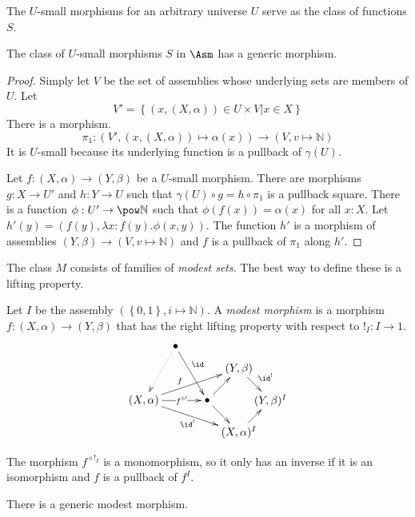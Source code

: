 \documentclass{tac}
\newcommand\set[1]{\left\{#1\right\}}
\newcommand\N{\mathbb N}
\newcommand\bang{!}
\newcommand\of{:}
\newcommand\gen\gamma
\newcommand\pe[1]{^{\diamond #1}}
\begin{document}
The $U$-small morphisms for an arbitrary universe $U$ serve as the class of functions $S$.

\begin{lemma} The class of $U$-small morphisms $S$ in $\Asm$ has a generic morphism. \end{lemma}

\begin{proof}
Simply let $V$ be the set of assemblies whose underlying sets are members of $U$.
Let 
\[ V'=\set{(x,(X,\alpha)) \in U\times V| x\in X} \]
There is a morphism. 
\[\pi_1\of(V',(x,(X,\alpha))\mapsto \alpha(x))\to(V,v\mapsto\N) \]
It is $U$-small because its underlying function is a pullback of $\gen(U)$. 

Let $f\of (X,\alpha)\to (Y,\beta)$ be a $U$-small morphism. There are morphisms $g\of X\to U'$ and $h\of Y\to U$ such that $\gen(U)\circ g = h\circ \pi_1$ is a pullback square. There is a function $\phi\of U'\to\pow\N$ such that $\phi(f(x))=\alpha(x)$ for all $x\of X$. Let $h'(y) = (f(y),\lambda x\of f(y).\phi(x,y))$. The function $h'$ is a morphism of assemblies $(Y,\beta)\to (V,v\mapsto\N)$ and $f$ is a pullback of $\pi_1$ along $h'$.
\end{proof}

The class $M$ consists of families of \emph{modest sets}. The best way to define these is a lifting property.

\begin{definition} Let $I$ be the assembly $(\set{0,1},i\mapsto\N)$. A \emph{modest morphism} is a morphism $f\of(X,\alpha)\to(Y,\beta)$ that has the right lifting property with respect to $\bang_I\of I\to 1$.
\[\xy
(0,10)*+{(X,\alpha)}="left", (10,27)*+{\bullet}="extra",(20,10)*+{\bullet}="middle", (30,20)*+{(Y,\beta)}="top", (30,0)*+{(X,\alpha)^I}="bottom", (40,10)*+{(Y,\beta)^I}="right"
\ar^(.4)f "left";"top" \ar|(.6){f\pe\bang} "left";"middle" \ar_{\id^\bang} "left";"bottom"
\ar "middle";"top" \ar"middle";"bottom"
\ar^{\id^\bang} "top";"right" \ar "bottom";"right"
\ar^(.4){\id} "extra";"middle"  \ar@{.>} "extra";"left"
\endxy\]
\end{definition}

The morphism $f\pe{\bang_I}$ is a monomorphism, so it only has an inverse if it is an isomorphism and $f$ is a pullback of $f^I$.

\begin{lemma} There is a generic modest morphism. \end{lemma}
\end{document}
